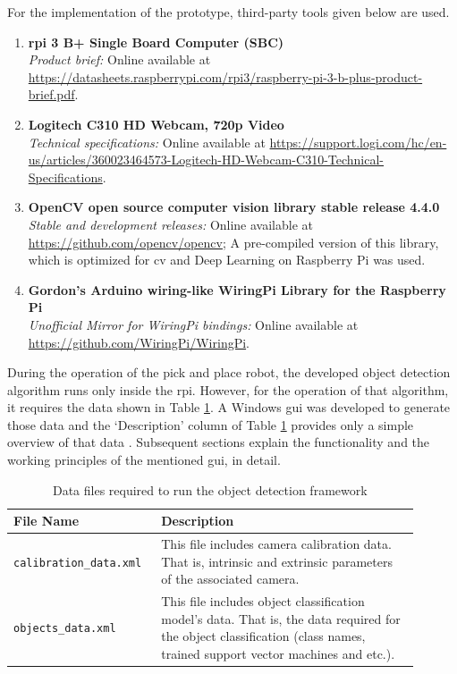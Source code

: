 \documentclass[a4paper,12pt]{report}%
\begin{document}
For the implementation of the prototype, third-party tools given below are used.\\

\begin{enumerate}[1.]
	\item \textbf{\ac{rpi} 3 B+ Single Board Computer (SBC)}\\
	\textit{Product brief:} Online available at \url{https://datasheets.raspberrypi.com/rpi3/raspberry-pi-3-b-plus-product-brief.pdf}.
	
	\item \textbf{Logitech C310 HD Webcam, 720p Video}\\
	\textit{Technical specifications:} Online available at \url{https://support.logi.com/hc/en-us/articles/360023464573-Logitech-HD-Webcam-C310-Technical-Specifications}.
	
	\item \textbf{OpenCV open source computer vision library stable release 4.4.0}\cite{opencv_library} \\
	\textit{Stable and development releases:} Online available at \url{https://github.com/opencv/opencv}; A pre-compiled version of this library, which is optimized for \ac{cv} and Deep Learning on Raspberry Pi was used.
	
	\item \textbf{Gordon's Arduino wiring-like WiringPi Library for the Raspberry Pi}\cite{wiringpi} \\
	\textit{Unofficial Mirror for WiringPi bindings:} Online available at \url{https://github.com/WiringPi/WiringPi}.
	
\end{enumerate}


During the operation of the pick and place robot, the developed object detection algorithm runs only inside the \ac{rpi}. However, for the operation of that algorithm, it requires the data shown in Table \ref{table:datafiles}. A Windows \ac{gui} was developed to generate those data and the `Description' column of Table \ref{table:datafiles} provides only a simple overview of that data . Subsequent sections explain the functionality and the working principles of the mentioned \ac{gui}, in detail.\\

\begin{table}[H]
	\captionsetup{font=sc, labelsep=newline}
	\centering
	\caption{ Data files required to run the object detection framework}
	\begin{tabular}{|p{0.3\linewidth}  |p{0.6\linewidth}  |}
		\hline
		\textbf{File Name} & \textbf{Description}\\\hline
		{\tt calibration\_data.xml} & This file includes camera calibration data. That is, intrinsic and extrinsic parameters of the associated camera.\\ \hline
		{\tt objects\_data.xml} & This file includes object classification model's data. That is, the data required for the object classification (class names, trained support vector machines and etc.).\\
		\hline
	\end{tabular}
	\label{table:datafiles}
\end{table}
\end{document}
